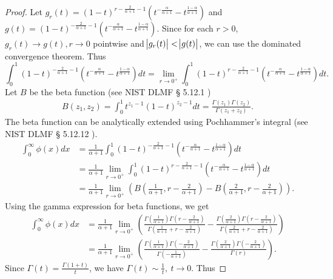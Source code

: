 \documentclass[10pt]{article}
\theoremstyle{plain}
\theoremstyle{definition}
\begin{document}
\begin{proof}
		Let $g_r(t)=(1-t)^{r-\frac{2}{\alpha+1}-1}
		(t^{-\frac{\alpha}{\alpha+1}}-t^{\frac{1-\alpha}{\alpha+1}})$ and $g(t)=(1-t)^{-\frac{2}{\alpha+1}-1}
		(t^{-\frac{\alpha}{\alpha+1}}-t^{\frac{1-\alpha}{\alpha+1}})$. Since for each $r>0$, $g_r(t)\to g(t), r\to0$ pointwise
		and $\abs{g_r(t)}<\abs{g(t)}$, we can use the dominated convergence theorem. Thus
		\begin{equation}
			\int_{0}^{1} (1-t)^{-\frac{2}{\alpha+1}-1}
			(t^{-\frac{\alpha}{\alpha+1}}-t^{\frac{1-\alpha}{\alpha+1}})dt
			=\lim_{r\to0^+} \int_{0}^{1} (1-t)^{r-\frac{2}{\alpha+1}-1}
			(t^{-\frac{\alpha}{\alpha+1}}-t^{\frac{1-\alpha}{\alpha+1}})dt.
		\end{equation}
		Let $B$ be the beta function (see NIST DLMF § 5.12.1 \cite{NIST:DLMF})
		\begin{align}
			B(z_1, z_2)=\int_{0}^{1} t^{z_1-1}(1-t)^{z_2-1}dt=\frac{\Gamma(z_1)\Gamma(z_2)}{\Gamma(z_1+z_2)}.
		\end{align}
		The beta function can be analytically extended using Pochhammer's integral (see NIST DLMF § 5.12.12 \cite{NIST:DLMF}).
		\begin{align}
			\int_{0}^{\infty} \phi(x)dx&=\frac{1}{\alpha+1}\int_{0}^{1} (1-t)^{-\frac{2}{\alpha+1}-1}
			(t^{-\frac{\alpha}{\alpha+1}}-t^{\frac{1-\alpha}{\alpha+1}})dt\\
			&=\frac{1}{\alpha+1} \lim_{r\to0^+} \int_{0}^{1} (1-t)^{r-\frac{2}{\alpha+1}-1}
			(t^{-\frac{\alpha}{\alpha+1}}-t^{\frac{1-\alpha}{\alpha+1}})dt\\
			&=\frac{1}{\alpha+1}\lim_{r\to 0^+}\left(B\left(\frac{1}{\alpha+1}, r-\frac{2}{\alpha+1}\right)-
			B\left(\frac{2}{\alpha+1}, r-\frac{2}{\alpha+1}\right)\right).
		\end{align}
		Using the gamma expression for beta functions, we get
		\begin{align}
			\int_{0}^{\infty} \phi(x)dx&=\frac{1}{\alpha+1}\lim_{r\to 0^+}\left(
			\frac{\Gamma(\frac{1}{\alpha+1})\Gamma(r-\frac{2}{\alpha+1})}{\Gamma(\frac{1}{\alpha+1}+r-\frac{2}{\alpha+1})}
			-
			\frac{\Gamma(\frac{2}{\alpha+1})\Gamma(r-\frac{2}{\alpha+1})}{\Gamma(\frac{2}{\alpha+1}+r-\frac{2}{\alpha+1})}
			\right)\\
			&=\frac{1}{\alpha+1}\lim_{r\to 0^+}\left(
			\frac{\Gamma(\frac{1}{\alpha+1})\Gamma(-\frac{2}{\alpha+1})}{\Gamma(-\frac{1}{\alpha+1})}
			-
			\frac{\Gamma(\frac{2}{\alpha+1})\Gamma(-\frac{2}{\alpha+1})}{\Gamma(r)}
			\right).
		\end{align}
		Since $\Gamma(t)=\frac{\Gamma(1+t)}{t}$, we have $\Gamma(t)\sim\frac{1}{t}, \ t\to 0$. Thus

\end{proof}
\end{document}
